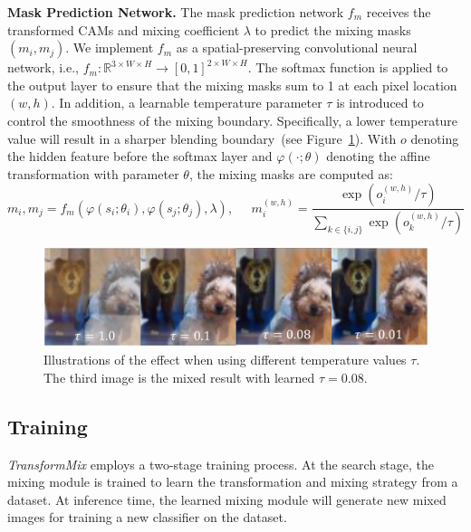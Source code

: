 \documentclass[10pt]{article} %
\newcommand{\TMIX}[0]{\textit{TransformMix }}
\begin{document}
\textbf{Mask Prediction Network.}
The mask prediction network $f_m$ receives the transformed CAMs and mixing coefficient $\lambda$ to predict the mixing masks $(m_i, m_j)$. We implement $f_m$ as a spatial-preserving convolutional neural network, i.e., $f_m: \mathbb{R}^{3 \times W \times H} \rightarrow [0,1]^{2 \times W \times H}$.  The softmax function is applied to the output layer to ensure that the mixing masks sum to 1 at each pixel location $(w,h)$. In addition, a learnable temperature parameter $\tau$ is introduced to control the smoothness of the mixing boundary. Specifically, a lower temperature value will result in a sharper blending boundary~(see Figure~\ref{fig:test2}). With $o$ denoting the hidden feature before the softmax layer and $\varphi(\cdot; \theta)$ denoting the affine transformation with parameter $\theta$, the mixing masks are computed as:
\begin{equation}
	m_i, m_j = f_m(\varphi(s_i;\theta_i), \varphi(s_j;\theta_j), \lambda),\;\;\;\;\;
	m_i^{(w,h)} = 
	\frac	{\exp (o_i^{(w,h)}/\tau)}
			{\sum_{k \in \{i,j\}}\exp (o_k^{(w,h)}/\tau)}
\end{equation}

\begin{figure}[h]
  \centering
  \includegraphics[width=0.6\linewidth]{./img/temp}
  \caption{Illustrations of the effect when using different temperature values $\tau$. The third image is the mixed result with learned $\tau=0.08$.}
  \label{fig:test2}
\end{figure}

\subsection{Training}
\noindent \TMIX employs a two-stage training process. At the search stage, the mixing module is trained to learn the transformation and mixing strategy from a dataset. At inference time, the learned mixing module will generate new mixed images for training a new classifier on the dataset.
\end{document}
